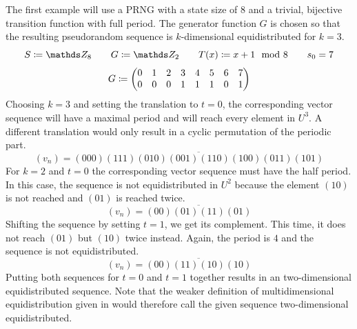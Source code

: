 \documentclass{stdlocal}
\begin{document}
  \noindent
  The first example will use a PRNG with a state size of $8$ and a trivial, bijective transition function with full period.
  The generator function $G$ is chosen so that the resulting pseudorandom sequence is $k$-dimensional equidistributed for $k=3$.
  \[
    S \define \setInteger_{8}
    \separate
    G \define \setInteger_2
    \separate
    T(x) \define x + 1 \mod 8
    \separate
    s_0 = 7
  \]
  \[
    \setcounter{MaxMatrixCols}{20}
    G \define
    \begin{pmatrix}
      0 & 1 & 2 & 3 & 4 & 5 & 6 & 7 \\
      0 & 0 & 0 & 1 & 1 & 1 & 0 & 1
    \end{pmatrix}
  \]
  Choosing $k=3$ and setting the translation to $t=0$, the corresponding vector sequence will have a maximal period and will reach every element in $U^3$.
  A different translation would only result in a cyclic permutation of the periodic part.
  \[
    (v_n) = \overline{(000)(111)(010)(001)(110)(100)(011)(101)}
  \]
  For $k=2$ and $t=0$ the corresponding vector sequence must have the half period.
  In this case, the sequence is not equidistributed in $U^2$ because the element $(10)$ is not reached and $(01)$ is reached twice.
  \[
    (v_n) = \overline{(00)(01)(11)(01)}
  \]
  Shifting the sequence by setting $t=1$, we get its complement.
  This time, it does not reach $(01)$ but $(10)$ twice instead.
  Again, the period is $4$ and the sequence is not equidistributed.
  \[
    (v_n) = \overline{(00)(11)(10)(10)}
  \]
  Putting both sequences for $t=0$ and $t=1$ together results in an two-dimensional equidistributed sequence.
  Note that the weaker definition of multidimensional equidistribution given in \textcite{lecuyer1994} would therefore call the given sequence two-dimensional equidistributed.
\end{document}
